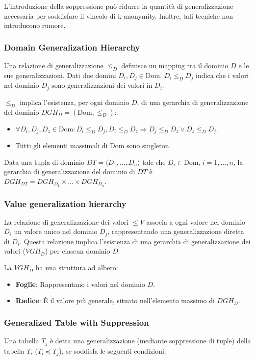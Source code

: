 \documentclass{report}
\begin{document}
\noindent L'introduzione della soppressione può ridurre la quantità di generalizzazione necessaria per soddisfare il vincolo di k-anonymity.
Inoltre, tali tecniche non introducono rumore.

\subsubsection{Domain Generalization Hierarchy}
Una relazione di generalizzazione $\leq_D$ definisce un mapping tra il dominio $D$ e le sue generalizzazioni.
Dati due domini $D_i, D_j \in \text{Dom}$, $D_i \leq_D D_j$ indica che i valori nel dominio $D_j$ sono generalizzazioni dei valori in $D_i$.

\noindent $\leq_D$ implica l'esistenza, per ogni dominio $D$, di una gerarchia di generalizzazione del dominio $DGH_D = (\text{Dom}, \leq_D)$:
    \begin{itemize}
        \item $\forall D_i, D_j, D_z \in \text{Dom}: D_i \leq_D D_j, D_i \leq_D D_z \Rightarrow D_j \leq_D D_z \lor D_z \leq_D D_j$.
        \item Tutti gli elementi massimali di $\text{Dom}$ sono singleton.
    \end{itemize}
Data una tupla di dominio $DT = \langle D_1, \ldots, D_n \rangle$ tale che $D_i \in \text{Dom}$, $i = 1, \ldots, n$, la gerarchia di generalizzazione del dominio di $DT$ è $DGH_{DT} = DGH_{D_1} \times \ldots \times DGH_{D_n}$.

\subsubsection{Value generalization hierarchy}
La relazione di generalizzazione dei valori \( \leq V \) associa a ogni valore nel dominio \( D_i \) un valore unico nel dominio \( D_j \), rappresentando una generalizzazione diretta di \( D_i \). 
Questa relazione implica l'esistenza di una gerarchia di generalizzazione dei valori ($ VGH_{D} $) per ciascun dominio \( D \).

\noindent La $ VGH_{D} $ ha una struttura ad albero:
\begin{itemize}
    \item \textbf{Foglie}: Rappresentano i valori nel dominio \( D \).
    \item \textbf{Radice}: È il valore più generale, situato nell'elemento massimo di $ DGH_{D} $.
\end{itemize}

\subsubsection{Generalized Table with Suppression}
Una tabella \( T_j \) è detta una generalizzazione (mediante soppressione di tuple) della tabella \( T_i \) (\( T_i \preceq T_j \)), se soddisfa le seguenti condizioni:
\end{document}
